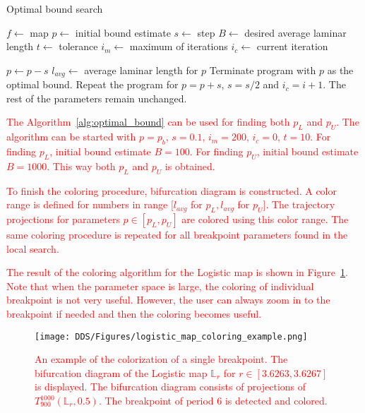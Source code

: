 \begin{algorithm}[!h]
    \caption{Optimal bound search}
    \label{alg:optimal_bound}
    \begin{algorithmic}[1]
        \Statex $f \gets$ map
        \Statex $p \gets$ initial bound estimate
        \Statex $s \gets$ step
        \Statex $B \gets$ desired average laminar length
        \Statex $t \gets$ tolerance
        \Statex $i_{m} \gets$ maximum of iterations
        \Statex $i_{c} \gets$ current iteration

            \State $p \gets p - s$
            \State $l_{avg} \gets$ average laminar length for $p$
                \State Terminate program with $p$ as the optimal bound.
            \EndIf
                \State Repeat the program for $p = p+s$, $s = s/2$ and $i_{c} = i+1$. The rest of the parameters remain unchanged.
            \EndIf
        \EndFor
    \end{algorithmic}
\end{algorithm}

\textcolor{red}{
The Algorithm~\ref{alg:optimal_bound} can be used for finding both $p_L$ and $p_U$.
The algorithm can be started with $p = p_b$, $s = 0.1$, $i_{m} = 200$, $i_{c} = 0$, $t = 10$.
For finding $p_L$, initial bound estimate $B = 100$.
For finding $p_U$, initial bound estimate $B = 1000$.
This way both $p_L$ and $p_U$ is obtained.
}
\par
\textcolor{red}{
To finish the coloring procedure, bifurcation diagram is constructed.
A color range is defined for numbers in range $[ l_{avg}$ for $p_L, l_{avg}$ for $p_U ]$.
The trajectory projections for parameters $p \in [ p_L, p_U ]$ are colored using this color range.
The same coloring procedure is repeated for all breakpoint parameters found in the local search.
}
\par
\textcolor{red}{
The result of the coloring algorithm for the Logistic map is shown in Figure~\ref{fig:coloring_example}.
Note that when the parameter space is large, the coloring of individual breakpoint is not very useful.
However, the user can always zoom in to the breakpoint if needed and then the coloring becomes useful.
}

\begin{figure}[!h]
    \centering
    \texttt{[image: DDS/Figures/logistic\_map\_coloring\_example.png]}
    \label{fig:coloring_example}
    \caption{
        \textcolor{red}{
        An example of the colorization of a single breakpoint.
        The bifurcation diagram of the Logistic map $\mathbb{L}_{r}$ for $r \in [ 3.6263, 3.6267 ]$ is displayed.
        The bifurcation diagram consists of projections of $T_{900}^{1000}(\mathbb{L}_{r}, 0.5)$.
        The breakpoint of period $6$ is detected and colored.
        }
    }
\end{figure}

